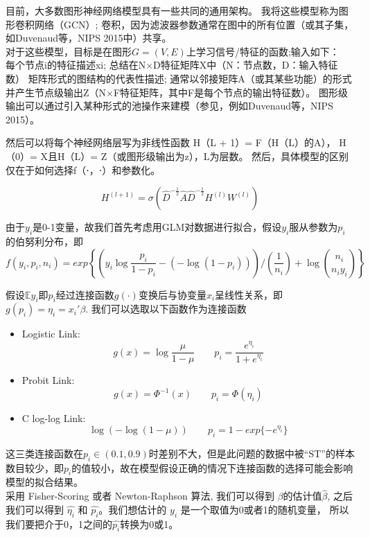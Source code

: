 \documentclass[a4paper,UTF8]{article}
\begin{document}
目前，大多数图形神经网络模型具有一些共同的通用架构。 我将这些模型称为图形卷积网络（GCN）; 卷积，因为滤波器参数通常在图中的所有位置（或其子集，如Duvenaud等，NIPS 2015中）共享。\\

对于这些模型，目标是在图形$G=(V,E)$上学习信号/特征的函数;输入如下：\\

每个节点i的特征描述xi; 总结在N×D特征矩阵X中（N：节点数，D：输入特征数）
矩阵形式的图结构的代表性描述; 通常以邻接矩阵A（或其某些功能）的形式
并产生节点级输出Z（N×F特征矩阵，其中F是每个节点的输出特征数）。 图形级输出可以通过引入某种形式的池操作来建模（参见，例如Duvenaud等，NIPS 2015）。

然后可以将每个神经网络层写为非线性函数
H（L + 1）= F（H（L）的A），
H（0）= X且H（L）= Z（或图形级输出为z），L为层数。 然后，具体模型的区别仅在于如何选择f（⋅，⋅）和参数化。

\[ H^{(l+1)} = \sigma \left( \hat{D}^{-\frac{1}{2}} \hat{A} \hat{D}^{-\frac{1}{2}} H^{(l)}W^{(l)}\right)\]




由于$y_{i}$是0-1变量，故我们首先考虑用GLM对数据进行拟合，假设$y_{i}$服从参数为$p_{i}$的伯努利分布，即
$$f(y_i,p_i,n_i)=exp\left\{ \left(y_{i}\log \frac{p_{i}}{1-p_{i}} -\left(-\log (1-p_{i}) \right)\right)/\left(\frac{1}{n_i} \right)+\log \binom{n_i}{n_iy_{i}} \right\} $$ 

假设$\mathbb{E}y_{i}$即$p_{i}$经过连接函数$g(\cdot)$变换后与协变量$x_{i}$呈线性关系，即$ g(p_{i})=\eta_{i}=x_{i}'\beta  $.
我们可以选取以下函数作为连接函数
\begin{itemize}
	\item Logistic Link: $$g(x)=\log \frac{\mu}{1-\mu}\quad\quad p_{i}=\frac{e^{\eta_{i}}}{1+e^{\eta_{i}}} $$
	\item Probit Link: $$g(x)=\Phi^{-1}(x) \quad\quad p_{i}=\Phi(\eta_{i})  $$
	\item C log-log Link: $$\log(-\log(1-\mu)) \quad\quad p_{i}=1-exp\{  -e^{\eta_{i}}\}$$
\end{itemize}

这三类连接函数在$p_{i}\in (0.1,0.9)$时差别不大，但是此问题的数据中被“ST”的样本数目较少，即$p_{i}$的值较小，故在模型假设正确的情况下连接函数的选择可能会影响模型的拟合结果。\\

采用 Fisher-Scoring 或者 Newton-Raphson 算法, 我们可以得到 $\beta$的估计值$\hat{\beta}$, 之后我们可以得到 $\hat{\eta_{i}}$ 和 $\hat{p_{i}}$。我们想估计的 $y_{i}$ 是一个取值为0或者1的随机变量， 所以我们要把介于0，1之间的$\hat{p_{i}}$转换为0或1。\\
\end{document}
